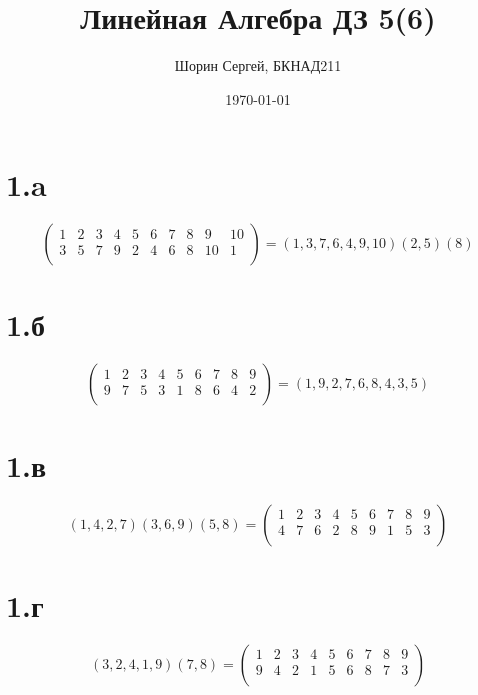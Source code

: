 \documentclass[a4paper]{article}
\author{Шорин Сергей, БКНАД211}
\title{Линейная Алгебра ДЗ 5(6)}
\date{\today}
\begin{document}
\maketitle

\newpage

\section*{1.a}

\begin{equation*}
\begin{pmatrix}
1 & 2 & 3 & 4 & 5 & 6 & 7 & 8 & 9 & 10\\
3 & 5 & 7 & 9 & 2 & 4 & 6 & 8 & 10 & 1\\
\end{pmatrix} = 
(1, 3, 7, 6, 4, 9, 10)(2, 5)(8)
\end{equation*}

\section*{1.б}
\begin{equation*}
\begin{pmatrix}
1 & 2 & 3 & 4 & 5 & 6 & 7 & 8 & 9\\
9 & 7 & 5 & 3 & 1 & 8 & 6 & 4 & 2\\
\end{pmatrix} = 
(1, 9, 2, 7, 6, 8, 4, 3, 5)
\end{equation*}


\section*{1.в}
\begin{equation*}
(1, 4, 2, 7)(3, 6, 9)(5, 8) = 
\begin{pmatrix}
1 & 2 & 3 & 4 & 5 & 6 & 7 & 8 & 9\\
4 & 7 & 6 & 2 & 8 & 9 & 1 & 5 & 3\\
\end{pmatrix}
\end{equation*}


\section*{1.г}
\begin{equation*}
(3, 2, 4, 1, 9)(7, 8) = 
\begin{pmatrix}
1 & 2 & 3 & 4 & 5 & 6 & 7 & 8 & 9\\
9 & 4 & 2 & 1 & 5 & 6 & 8 & 7 & 3\\
\end{pmatrix}
\end{equation*}
\end{document}
